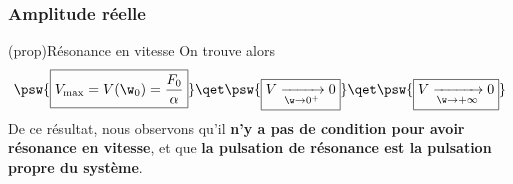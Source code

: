 \documentclass[../../main/main.tex]{subfiles}
\begin{document}
\subsubsection{Amplitude réelle}
\begin{tcb}(prop){Résonance en vitesse}
	On trouve alors
	\[
		\psw{
			\boxed{
				V_{\max} = V(\w_0) = \frac{F_0}{\alpha}
			}
		}
		\qet
		\psw{
			\boxed{
				V\xrightarrow[\w\to0^+]{} 0
			}
		}
		\qet
		\psw{
			\boxed{
				V\xrightarrow[\w\to+\infty]{} 0
			}
		}
	\]
	De ce résultat, nous observons qu'il \textbf{n'y a pas de condition pour
		avoir résonance en vitesse}, et que \textbf{la pulsation de résonance est la
		pulsation propre du système}.
\end{tcb}

\vspace{-15pt}
\end{document}
